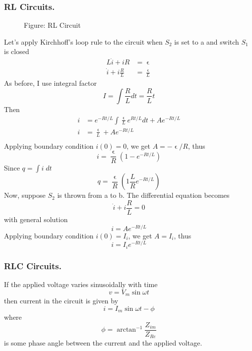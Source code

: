 \documentclass[../../../main.tex]{subfiles}
\begin{document}
\subsubsection*{RL Circuits.} 
\begin{figure*}[b]
    \centering
    \caption*{Figure: RL Circuit}
\end{figure*}
Let’s apply Kirchhoff’s loop rule to the circuit when $S_2$ is set to a and switch $S_1$ is closed
\begin{align*}
    L\dot{i}+iR&=\upvarepsilon\\
    \dot{i}+i\frac{R}{L}&=\frac{\upvarepsilon}{L}
\end{align*}
As before, I use integral factor
\begin{equation*}
    I=\int \frac{R}{L}dt=\frac{R}{L}t
\end{equation*}
Then 
\begin{align*}
    i&=e^{-Rt/L}\int \frac{\upvarepsilon}{L}e^{Rt/L}dt+Ae^{-Rt/L}\\
    i&=\frac{\upvarepsilon}{L}+Ae^{-Rt/L}\\
\end{align*}
Applying boundary condition $i(0) = 0$, we get $A=-\upvarepsilon/R$, thus
\begin{equation*}
    i=\frac{\upvarepsilon}{R}(1-e^{-Rt/L})
\end{equation*}
Since $q= \int i\;dt$
\begin{equation*}
    q=\frac{\upvarepsilon}{R}(1\frac{L}{R}e^{-Rt/L})
\end{equation*}
Now, suppose $S_2$ is thrown from a to b. The differential equation becomes
\begin{equation*}
    \dot{i}+i\frac{R}{L}=0
\end{equation*}
with general solution
\begin{equation*}
    i=Ae^{-Rt/L}
\end{equation*}
Applying boundary condition $i(0) = I_i$, we get $A = I_i$, thus
\begin{equation*}
    i=I_ie^{-Rt/L}
\end{equation*}

\subsubsection*{RLC Circuits.} If the applied voltage varies sinusoidally with time
\begin{equation*}
    v=V_m\sin \omega t
\end{equation*}
then current in the circuit is given by
\begin{equation*}
    i=I_m\sin\omega t-\phi
\end{equation*}
where
\begin{equation*}
    \phi=\arctan^{-1}\frac{Z_{im}}{Z_{Re}}
\end{equation*}
is some phase angle between the current and the applied voltage.
\end{document}
